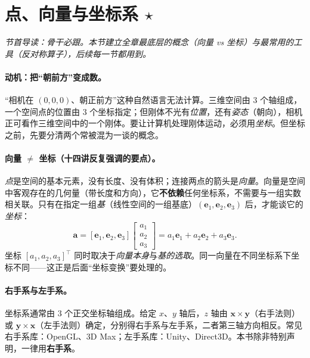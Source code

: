 \section{点、向量与坐标系 \texorpdfstring{$\star$}{*}}
\label{sec:rb-vector}
\noindent\emph{节首导读：骨干必跟。本节建立全章最底层的概念（向量 vs 坐标）与最常用的工具（反对称算子），后续每一节都用到。}

\paragraph{动机：把“朝前方”变成数。}
“相机在 $(0,0,0)$、朝正前方”这种自然语言无法计算。三维空间由 $3$ 个轴组成，一个空间点的位置由 $3$ 个坐标指定；但刚体不光有\emph{位置}，还有\emph{姿态}（朝向），相机正可看作三维空间中的一个刚体\cite{gaoxiang2019slam14}。要让计算机处理刚体运动，必须用\emph{坐标}。但坐标之前，先要分清两个常被混为一谈的概念。

\paragraph{向量 $\neq$ 坐标（十四讲反复强调的要点）。}
\emph{点}是空间的基本元素，没有长度、没有体积；连接两点的箭头是\emph{向量}。向量是空间中客观存在的几何量（带长度和方向），它\textbf{不依赖}任何坐标系，不需要与一组实数相关联。只有在指定一组\emph{基}（线性空间的一组基底）$(\mathbf{e}_1,\mathbf{e}_2,\mathbf{e}_3)$ 后，才能谈它的\emph{坐标}：
\begin{equation}
  \mathbf{a}=[\mathbf{e}_1,\mathbf{e}_2,\mathbf{e}_3]\begin{bmatrix}a_1\\a_2\\a_3\end{bmatrix}=a_1\mathbf{e}_1+a_2\mathbf{e}_2+a_3\mathbf{e}_3.
  \label{eq:coord}
\end{equation}
坐标 $[a_1,a_2,a_3]^\top$ 同时取决于\emph{向量本身}与\emph{基的选取}。同一向量在不同坐标系下坐标不同——这正是后面“坐标变换”要处理的。

\paragraph{右手系与左手系。}坐标系通常由 $3$ 个正交坐标轴组成。给定 $x$、$y$ 轴后，$z$ 轴由 $\mathbf{x}\times\mathbf{y}$（右手法则）或 $\mathbf{y}\times\mathbf{x}$（左手法则）确定，分别得右手系与左手系，二者第三轴方向相反。常见右手系库：OpenGL、3D Max；左手系库：Unity、Direct3D\cite{gaoxiang2019slam14}。本书除非特别声明，一律用\textbf{右手系}。

